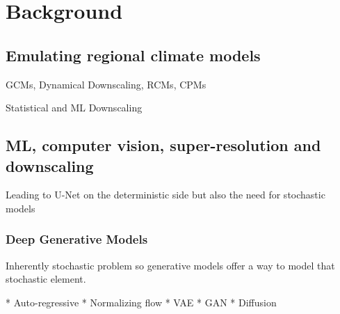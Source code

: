 \chapter{Background}
\label{chap:bg}


\section{Emulating regional climate models}


GCMs, Dynamical Downscaling, RCMs, CPMs

Statistical and ML Downscaling



\section{ML, computer vision, super-resolution and downscaling}

Leading to U-Net on the deterministic side but also the need for stochastic models

\subsection{Deep Generative Models}

Inherently stochastic problem so generative models offer a way to model that stochastic element.

* Auto-regressive
* Normalizing flow
* VAE
* GAN
* Diffusion